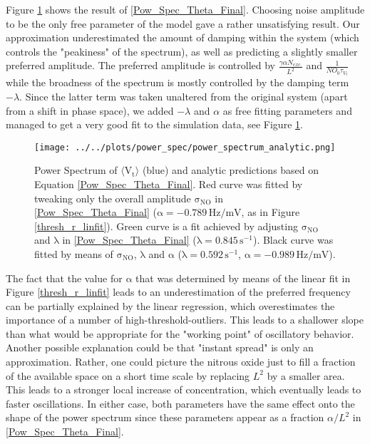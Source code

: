 \documentclass[10pt,a4paper]{article}
\begin{document}
Figure \ref{Pow_Spec_Theta_vs_Analytic} shows the result of \eqref{Pow_Spec_Theta_Final}. Choosing noise amplitude to be the only free parameter of the model gave a rather unsatisfying result. Our approximation underestimated the amount of damping within the system (which controls the "peakiness" of the spectrum), as well as predicting a slightly smaller preferred amplitude. The preferred amplitude is controlled by $\frac{\gamma \alpha N_{exc.}}{L^2}$ and $\frac{1}{NO_0\tau_{V_t}}$ while the broadness of the spectrum is mostly controlled by the damping term $-\lambda$. Since the latter term was taken unaltered from the original system (apart from a shift in phase space), we added $-\lambda$ and $\alpha$ as free fitting parameters and managed to get a very good fit to the simulation data, see Figure \ref{Pow_Spec_Theta_vs_Analytic}.   
\begin{figure}
\begin{center}
\texttt{[image: ../../plots/power\_spec/power\_spectrum\_analytic.png]}
\end{center}
\caption{Power Spectrum of $\mathrm{\langle V_t \rangle}$ (blue) and analytic predictions based on Equation \eqref{Pow_Spec_Theta_Final}. Red curve was fitted by tweaking only the overall amplitude $\mathrm{\sigma_{NO}}$ in \eqref{Pow_Spec_Theta_Final} ($\mathrm{\alpha = -0.789 \,Hz/mV}$, as in Figure \ref{thresh_r_linfit}). Green curve is a fit achieved by adjusting $\mathrm{\sigma_{NO}}$ and $\mathrm{\lambda}$ in \eqref{Pow_Spec_Theta_Final} ($\mathrm{\lambda = 0.845 \,s^{-1}}$). Black curve was fitted by means of $\mathrm{\sigma_{NO}}$, $\mathrm{\lambda}$ and $\mathrm{\alpha}$ ($\mathrm{\lambda = 0.592 \,s^{-1}}$, $\mathrm{\alpha=-0.989 \,Hz/mV}$).}
\label{Pow_Spec_Theta_vs_Analytic}
\end{figure}
The fact that the value for $\mathrm{\alpha}$ that was determined by means of the linear fit in Figure \ref{thresh_r_linfit} leads to an underestimation of the preferred frequency can be partially explained by the linear regression, which overestimates the importance of a number of high-threshold-outliers. This leads to a shallower slope than what would be appropriate for the "working point" of oscillatory behavior. Another possible explanation could be that "instant spread" is only an approximation. Rather, one could picture the nitrous oxide just to fill a fraction of the available space on a short time scale by replacing $L^2$ by a smaller area. This leads to a stronger local increase of concentration, which eventually leads to faster oscillations. In either case, both parameters have the same effect onto the shape of the power spectrum since these parameters appear as a fraction $\alpha/L^2$ in \eqref{Pow_Spec_Theta_Final}. 
\end{document}
